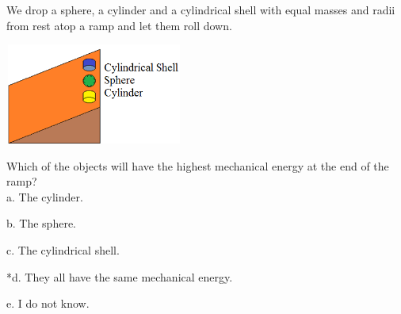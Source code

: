 
We drop a sphere, a cylinder and a cylindrical shell with equal masses and radii from rest atop a ramp and let them roll down.

\includegraphics[width=2.3in,height=1.3in]{../../Images/WorkAndEnergyQ2.png} 

Which of the objects will have the highest mechanical energy at the end of the ramp? \\

a. The cylinder.

b. The sphere.

c. The cylindrical shell.

*d. They all have the same mechanical energy.

e. I do not know. \\
